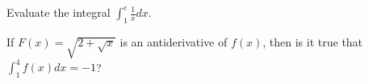 \documentclass[../main.tex]{subfiles}
\begin{document}
\begin{example}
  Evaluate the integral \href{https://www.wolframalpha.com/input?i=integrate+1%2Fx+dx+from+1+to+e}{\(\int_{1}^{e} \frac{1}{x} dx\)}.
\end{example}
\vspace{1.5in}

\begin{example}
  If \(F(x) = \sqrt{2 + \sqrt{x}}\) is an antiderivative of \(f(x)\), then is it true that \(\int_{1}^{4} f(x) dx = -1\)?
\end{example}
\vspace{1.5in}

\clearpage
\end{document}
